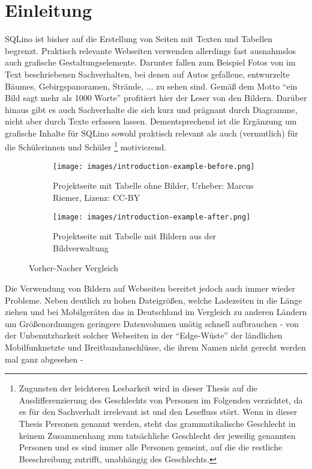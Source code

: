 \section{Einleitung}
\label{sec:introduction}

SQLino ist bisher auf die Erstellung von Seiten mit Texten und Tabellen
begrenzt. Praktisch relevante Webseiten verwenden allerdings fast ausnahmslos
auch grafische Gestaltungselemente. Darunter fallen zum Beispiel Fotos von im
Text beschriebenen Sachverhalten, bei denen auf Autos gefallene, entwurzelte
Bäumes, Gebirgspanoramen, Strände, ... zu sehen sind. Gemäß dem Motto
\enquote{ein Bild sagt mehr als 1000 Worte} profitiert hier der Leser von den
Bildern. Darüber hinaus gibt es auch Sachverhalte die sich kurz und prägnant
durch Diagramme, nicht aber durch Texte erfassen lassen. Dementsprechend ist die
Ergänzung um grafische Inhalte für SQLino sowohl praktisch relevant als auch
(vermutlich) für die Schülerinnen und Schüler \footnote{Zugunsten der leichteren
  Lesbarkeit wird in dieser Thesis auf die Ausdifferenzierung des Geschlechts
  von Personen im Folgenden verzichtet, da es für den Sachverhalt irrelevant ist
  und den Lesefluss stört.  Wenn in dieser Thesis Personen genannt werden, steht
  das grammatikalische Geschlecht in keinem Zusammenhang zum tatsächliche
  Geschlecht der jeweilig genannten Personen und es sind immer alle Personen
  gemeint, auf die die restliche Beeschreibung zutrifft, unabhängig des
  Geschlechts.} motivierend.

\begin{figure}[ht]
  \begin{subfigure}[b]{\columnwidth}
    \texttt{[image: images/introduction-example-before.png]}
    \caption{Projektseite mit Tabelle ohne Bilder, Urheber: Marcus Riemer,
      Lizenz: CC-BY}
    \label{fig:comparison-before}
  \end{subfigure}
  \begin{subfigure}[b]{\columnwidth}
    \texttt{[image: images/introduction-example-after.png]}
    \caption{Projektseite mit Tabelle mit Bildern aus der Bildverwaltung}
    \label{fig:comparison-after}
  \end{subfigure}
  \caption{Vorher-Nacher Vergleich}
  \label{fig:comparison-before-after}
\end{figure}

Die Verwendung von Bildern auf Webseiten bereitet jedoch auch immer wieder
Probleme. Neben deutlich zu hohen Dateigrößen, welche Ladezeiten in die Länge
ziehen und bei Mobilgeräten das in Deutschland im Vergleich zu anderen Ländern um
Größenordnungen geringere Datenvolumen unötig schnell aufbrauchen - von der
Unbenutzbarkeit solcher Webseiten in der ``Edge-Wüste'' der ländlichen
Mobilfunknetzte und Breitbandanschlüsse, die ihrem Namen nicht gerecht werden
mal ganz abgesehen - 


